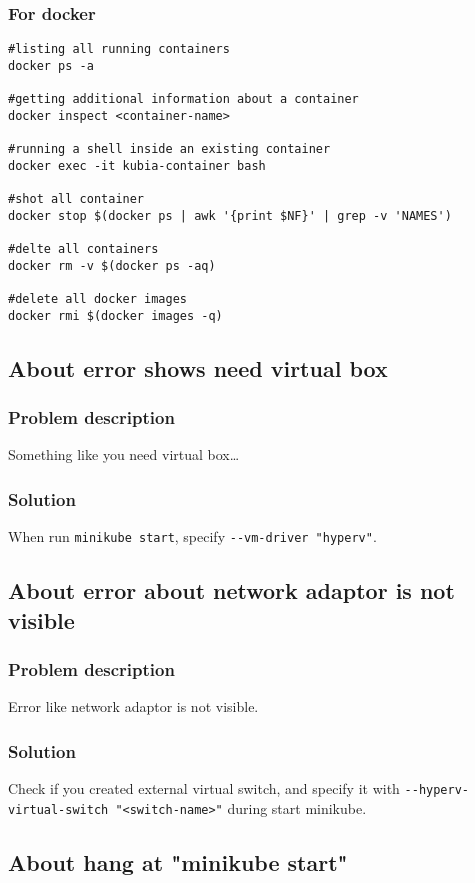 \documentclass[11pt]{article}
\begin{document}
\subsubsection{For docker}
\label{sec:org8f82a77}
\begin{verbatim}
#listing all running containers
docker ps -a

#getting additional information about a container 
docker inspect <container-name>

#running a shell inside an existing container 
docker exec -it kubia-container bash

#shot all container
docker stop $(docker ps | awk '{print $NF}' | grep -v 'NAMES')

#delte all containers
docker rm -v $(docker ps -aq)

#delete all docker images
docker rmi $(docker images -q)
\end{verbatim}
\subsection{About error shows need virtual box}
\label{sec:org268ce44}
\subsubsection{Problem description}
\label{sec:org465ea2a}
Something like you need virtual box\ldots{}
\subsubsection{Solution}
\label{sec:org4a17ae3}
When run \texttt{minikube start}, specify \texttt{-{}-vm-driver "hyperv"}.
\subsection{About error about network adaptor is not visible}
\label{sec:org784d722}
\subsubsection{Problem description}
\label{sec:orgd9c1b69}
Error like network adaptor is not visible.
\subsubsection{Solution}
\label{sec:orgefcef9e}
Check if you created external virtual switch, and specify it with \texttt{-{}-hyperv-virtual-switch "<switch-name>"} during start minikube.
\subsection{About hang at "minikube start"}
\label{sec:org768e383}
\end{document}
